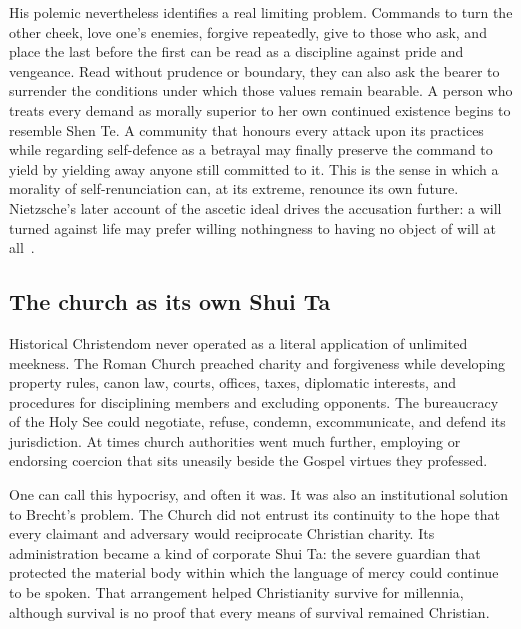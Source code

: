 ﻿\documentclass[12pt,a4paper]{book}
\begin{document}
His polemic nevertheless identifies a real limiting problem.  Commands to turn
the other cheek, love one's enemies, forgive repeatedly, give to those who ask,
and place the last before the first can be read as a discipline against pride
and vengeance.  Read without prudence or boundary, they can also ask the bearer
to surrender the conditions under which those values remain bearable.  A
person who treats every demand as morally superior to her own continued
existence begins to resemble Shen Te.  A community that honours every attack
upon its practices while regarding self-defence as a betrayal may finally
preserve the command to yield by yielding away anyone still committed to it.
This is the sense in which a morality of self-renunciation can, at its extreme,
renounce its own future.  Nietzsche's later account of the ascetic ideal drives
the accusation further: a will turned against life may prefer willing
nothingness to having no object of will at all~\cite[Third Essay,
\S~28]{Nietzsche-GM}.

\subsection{The church as its own Shui Ta}

Historical Christendom never operated as a literal application of unlimited
meekness.  The Roman Church preached charity and forgiveness while developing
property rules, canon law, courts, offices, taxes, diplomatic interests, and
procedures for disciplining members and excluding opponents.  The bureaucracy
of the Holy See could negotiate, refuse, condemn, excommunicate, and defend its
jurisdiction.  At times church authorities went much further, employing or
endorsing coercion that sits uneasily beside the Gospel virtues they professed.

One can call this hypocrisy, and often it was.  It was also an institutional
solution to Brecht's problem.  The Church did not entrust its continuity to the
hope that every claimant and adversary would reciprocate Christian charity.
Its administration became a kind of corporate Shui Ta: the severe guardian
that protected the material body within which the language of mercy could
continue to be spoken.  That arrangement helped Christianity survive for
millennia, although survival is no proof that every means of survival remained
Christian.
\end{document}
